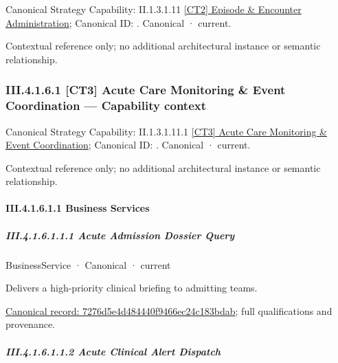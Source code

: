 {\small Canonical Strategy Capability: II.1.3.1.11 \hyperref[element:61d7067aee0540259b3daca4287d66d2]{[CT2] Episode \& Encounter Administration}; Canonical ID: \texttt{}. Canonical · current.}\par
Contextual reference only; no additional architectural instance or semantic relationship.\par
\subsubsection*{III.4.1.6.1 [CT3] Acute Care Monitoring \& Event Coordination — Capability context}
\label{navigation:III.4.1.6.1}

{\small Canonical Strategy Capability: II.1.3.1.11.1 \hyperref[element:ee17b26b8c874cc3af50d07a787ce488]{[CT3] Acute Care Monitoring \& Event Coordination}; Canonical ID: \texttt{}. Canonical · current.}\par
Contextual reference only; no additional architectural instance or semantic relationship.\par
\paragraph*{III.4.1.6.1.1 Business Services}
\label{navigation:III.4.1.6.1.1}

\subparagraph*{III.4.1.6.1.1.1 Acute Admission Dossier Query}
\label{navigation:III.4.1.6.1.1.1}

\label{element:7276d5e4d484440f9466ec24c183bdab}
{\small BusinessService · Canonical · current}\par

Delivers a high-priority clinical briefing to admitting teams.


{\footnotesize \href{../../../../../../../continuum/business/business-service/7276d5e4d484440f9466ec24c183bdab.md}{Canonical record: 7276d5e4d484440f9466ec24c183bdab}; full qualifications and provenance.}\par
\subparagraph*{III.4.1.6.1.1.2 Acute Clinical Alert Dispatch}
\label{navigation:III.4.1.6.1.1.2}

